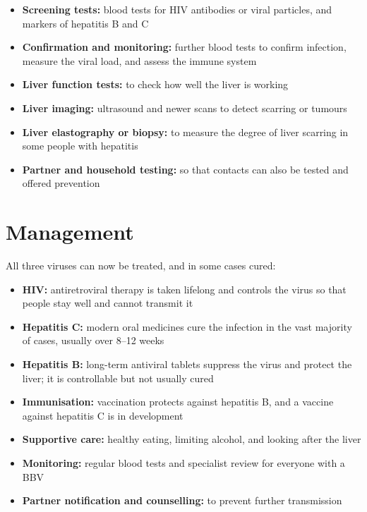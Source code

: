 \begin{itemize}
    \item \textbf{Screening tests:} blood tests for HIV antibodies or viral particles, and markers of hepatitis B and C
    \item \textbf{Confirmation and monitoring:} further blood tests to confirm infection, measure the viral load, and assess the immune system
    \item \textbf{Liver function tests:} to check how well the liver is working
    \item \textbf{Liver imaging:} ultrasound and newer scans to detect scarring or tumours
    \item \textbf{Liver elastography or biopsy:} to measure the degree of liver scarring in some people with hepatitis
    \item \textbf{Partner and household testing:} so that contacts can also be tested and offered prevention
\end{itemize}

\section*{Management}
All three viruses can now be treated, and in some cases cured:

\begin{itemize}
    \item \textbf{HIV:} antiretroviral therapy is taken lifelong and controls the virus so that people stay well and cannot transmit it
    \item \textbf{Hepatitis C:} modern oral medicines cure the infection in the vast majority of cases, usually over 8--12 weeks
    \item \textbf{Hepatitis B:} long-term antiviral tablets suppress the virus and protect the liver; it is controllable but not usually cured
    \item \textbf{Immunisation:} vaccination protects against hepatitis B, and a vaccine against hepatitis C is in development
    \item \textbf{Supportive care:} healthy eating, limiting alcohol, and looking after the liver
    \item \textbf{Monitoring:} regular blood tests and specialist review for everyone with a BBV
    \item \textbf{Partner notification and counselling:} to prevent further transmission
\end{itemize}

